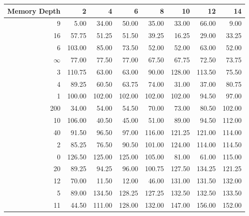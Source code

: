 \begin{tabular}{rrrrrrrr}
\toprule
 Memory Depth &       2 &       4 &       6 &       8 &      10 &      12 &      14 \\
\midrule
            9 &    5.00 &   34.00 &   50.00 &   35.00 &   33.00 &   66.00 &    9.00 \\
           16 &   57.75 &   51.25 &   51.50 &   39.25 &   16.25 &   29.00 &   33.25 \\
            6 &  103.00 &   85.00 &   73.50 &   52.00 &   52.00 &   63.00 &   52.00 \\
           $\infty$ &   77.00 &   77.50 &   77.00 &   67.50 &   67.75 &   72.50 &   73.75 \\
            3 &  110.75 &   63.00 &   63.00 &   90.00 &  128.00 &  113.50 &   75.50 \\
            4 &   89.25 &   60.50 &   63.75 &   74.00 &   31.00 &   37.00 &   80.75 \\
            1 &  100.00 &  102.00 &  102.00 &  102.00 &  102.00 &   94.50 &   97.00 \\
          200 &   34.00 &   54.00 &   54.50 &   70.00 &   73.00 &   80.50 &  102.00 \\
           10 &  106.00 &   40.50 &   45.00 &   51.00 &   89.00 &   94.50 &  112.00 \\
           40 &   91.50 &   96.50 &   97.00 &  116.00 &  121.25 &  121.00 &  114.00 \\
            2 &   85.25 &   76.50 &   90.50 &  101.00 &  124.00 &  114.00 &  114.50 \\
            0 &  126.50 &  125.00 &  125.00 &  105.00 &   81.00 &   61.00 &  115.00 \\
           20 &   89.25 &   94.25 &   96.00 &  100.75 &  127.50 &  134.25 &  121.25 \\
           12 &   70.00 &   11.50 &   12.00 &   46.00 &  131.00 &  131.50 &  132.00 \\
            5 &   89.00 &  134.50 &  128.25 &  127.25 &  132.50 &  132.50 &  133.50 \\
           11 &   44.50 &  111.00 &  128.00 &  132.00 &  147.00 &  156.00 &  152.00 \\
\bottomrule
\end{tabular}
